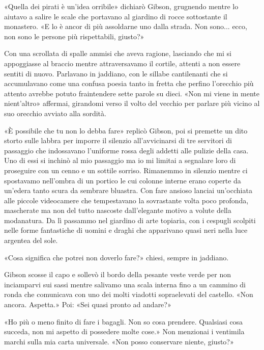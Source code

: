 \begin{figure}
	\centering
	\def\svgwidth{\columnwidth}
	\scalebox{0.2}{}
\end{figure}

«Quella dei pirati è un'idea orribile» dichiarò Gibson, grugnendo mentre
lo aiutavo a salire le scale che portavano al giardino di rocce
sottostante il monastero. «E lo è ancor di più assoldarne uno dalla
strada. Non sono... ecco, non sono le persone più rispettabili, giusto?»

Con una scrollata di spalle ammisi che aveva ragione, lasciando che mi
si appoggiasse al braccio mentre attraversavamo il cortile, attenti a
non essere sentiti di nuovo. Parlavano in jaddiano, con le sillabe
cantilenanti che si accumulavano come una confusa poesia tanto in fretta
che perfino l'orecchio più attento avrebbe potuto fraintendere sette
parole su dieci. «Non mi viene in mente nient'altro» affermai, girandomi
verso il volto del vecchio per parlare più vicino al suo orecchio
avviato alla sordità.

«È possibile che tu non lo debba fare» replicò Gibson, poi si premette
un dito storto sulle labbra per imporre il silenzio all'avvicinarsi di
tre servitori di passaggio che indossavano l'uniforme rossa degli
addetti alle pulizie della casa. Uno di essi si inchinò al mio passaggio
ma io mi limitai a segnalare loro di proseguire con un cenno e un
sottile sorriso. Rimanemmo in silenzio mentre ci spostavamo nell'ombra
di un portico le cui colonne interne erano coperte da un'edera tanto
scura da sembrare bluastra. Con fare ansioso lanciai un'occhiata alle
piccole videocamere che tempestavano la sovrastante volta poco profonda,
mascherate ma non del tutto nascoste dall'elegante motivo a volute della
modanatura. Da lì passammo nel giardino di arte topiaria, con i cespugli
scolpiti nelle forme fantastiche di uomini e draghi che apparivano quasi
neri nella luce argentea del sole.

«Cosa significa che potrei non doverlo fare?» chiesi, sempre in
jaddiano.

Gibson scosse il capo e sollevò il bordo della pesante veste verde per
non inciamparvi sui sassi mentre salivamo una scala interna fino a un
cammino di ronda che comunicava con uno dei molti viadotti sopraelevati
del castello. «Non ancora. Aspetta.» Poi: «Sei quasi pronto ad andare?»

«Ho più o meno finito di fare i bagagli. Non so cosa prendere. Qualsiasi
cosa succeda, non mi aspetto di possedere molte cose.» Non menzionai i
ventimila marchi sulla mia carta universale. «Non posso conservare
niente, giusto?»

